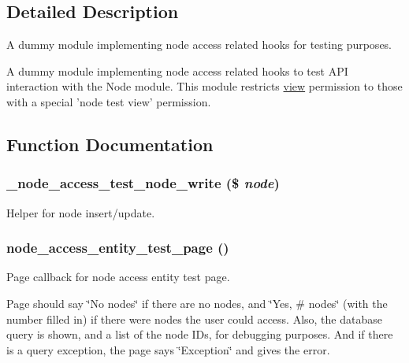 \subsection{Detailed Description}
A dummy module implementing node access related hooks for testing purposes.

A dummy module implementing node access related hooks to test API interaction with the Node module. This module restricts \hyperlink{classview}{view} permission to those with a special 'node test view' permission. 

\subsection{Function Documentation}
\hypertarget{node__access__test_8module_a64f2b481c2dd9b763d7ff9249d2ac827}{
\subsubsection[{\_\-node\_\-access\_\-test\_\-node\_\-write}]{\setlength{\rightskip}{0pt plus 5cm}\_\-node\_\-access\_\-test\_\-node\_\-write (\$ {\em node})}}
\label{node__access__test_8module_a64f2b481c2dd9b763d7ff9249d2ac827}
Helper for node insert/update. \hypertarget{node__access__test_8module_a303b4aa21e0a1afbca6067d38d5b961e}{
\subsubsection[{node\_\-access\_\-entity\_\-test\_\-page}]{\setlength{\rightskip}{0pt plus 5cm}node\_\-access\_\-entity\_\-test\_\-page ()}}
\label{node__access__test_8module_a303b4aa21e0a1afbca6067d38d5b961e}
Page callback for node access entity test page.

Page should say \char`\"{}No nodes\char`\"{} if there are no nodes, and \char`\"{}Yes, \# nodes\char`\"{} (with the number filled in) if there were nodes the user could access. Also, the database query is shown, and a list of the node IDs, for debugging purposes. And if there is a query exception, the page says \char`\"{}Exception\char`\"{} and gives the error.

